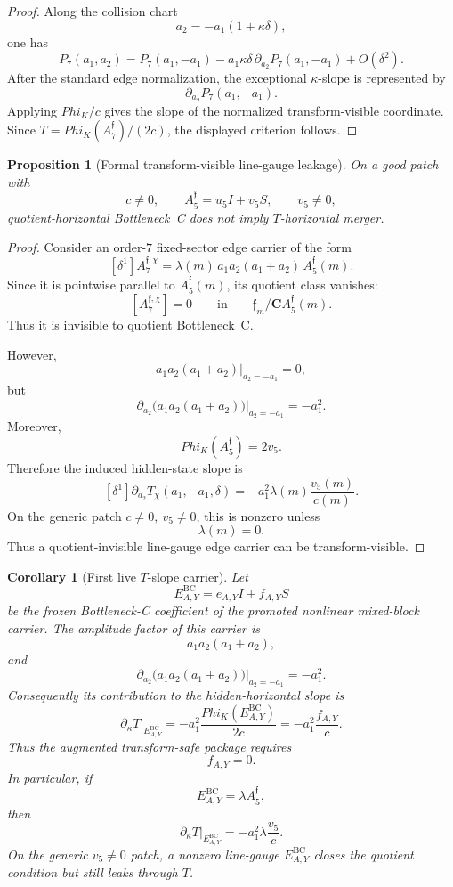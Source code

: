 \documentclass[11pt,a4paper]{amsart}
\def\Phi{Phi}%
\theoremstyle{plain}
\newtheorem{proposition}[theorem]{Proposition}
\newtheorem{corollary}[theorem]{Corollary}
\theoremstyle{definition}
\begin{document}
\begin{proof}
Along the collision chart
\[
a_2=-a_1(1+\kappa\delta),
\]
one has
\[
P_7(a_1,a_2)
=
P_7(a_1,-a_1)
-
a_1\kappa\delta\,\partial_{a_2}P_7(a_1,-a_1)
+
O(\delta^2).
\]
After the standard edge normalization, the exceptional \(\kappa\)-slope is
represented by
\[
\partial_{a_2}P_7(a_1,-a_1).
\]
Applying \(\Phi_K/c\) gives the slope of the normalized transform-visible
coordinate.  Since \(T=\Phi_K(A_7^{\mathfrak f})/(2c)\), the displayed
criterion follows.
\end{proof}

\begin{proposition}[Formal transform-visible line-gauge leakage]
\label{prop:formal-transform-visible-line-gauge-leakage}
On a good patch with
\[
c\ne0,
\qquad
A_5^{\mathfrak f}=u_5I+v_5S,
\qquad
v_5\ne0,
\]
quotient-horizontal Bottleneck~C does not imply \(T\)-horizontal merger.
\end{proposition}

\begin{proof}
Consider an order-\(7\) fixed-sector edge carrier of the form
\[
[\delta^1]A_7^{\mathfrak f,\chi}
=
\lambda(m)\,a_1a_2(a_1+a_2)\,A_5^{\mathfrak f}(m).
\]
Since it is pointwise parallel to \(A_5^{\mathfrak f}(m)\), its quotient class
vanishes:
\[
[A_7^{\mathfrak f,\chi}]=0
\qquad
\text{in}
\qquad
\mathfrak f_m/\mathbf C A_5^{\mathfrak f}(m).
\]
Thus it is invisible to quotient Bottleneck~C.

However,
\[
a_1a_2(a_1+a_2)\big|_{a_2=-a_1}=0,
\]
but
\[
\partial_{a_2}\bigl(a_1a_2(a_1+a_2)\bigr)\big|_{a_2=-a_1}
=
-a_1^2.
\]
Moreover,
\[
\Phi_K(A_5^{\mathfrak f})=2v_5.
\]
Therefore the induced hidden-state slope is
\[
[\delta^1]\partial_{a_2}T_\chi(a_1,-a_1,\delta)
=
-a_1^2\lambda(m)\frac{v_5(m)}{c(m)}.
\]
On the generic patch \(c\ne0,\ v_5\ne0\), this is nonzero unless
\[
\lambda(m)=0.
\]
Thus a quotient-invisible line-gauge edge carrier can be transform-visible.
\end{proof}

\begin{corollary}[First live \(T\)-slope carrier]
\label{cor:first-live-t-slope-carrier}
Let
\[
E_{A,Y}^{\mathrm{BC}}
=
e_{A,Y}I+f_{A,Y}S
\]
be the frozen Bottleneck-C coefficient of the promoted nonlinear mixed-block
carrier.  The amplitude factor of this carrier is
\[
a_1a_2(a_1+a_2),
\]
and
\[
\partial_{a_2}\bigl(a_1a_2(a_1+a_2)\bigr)\big|_{a_2=-a_1}
=
-a_1^2.
\]
Consequently its contribution to the hidden-horizontal slope is
\[
\partial_\kappa T\big|_{E_{A,Y}^{\mathrm{BC}}}
=
-a_1^2\frac{\Phi_K(E_{A,Y}^{\mathrm{BC}})}{2c}
=
-a_1^2\frac{f_{A,Y}}{c}.
\]
Thus the augmented transform-safe package requires
\[
f_{A,Y}=0.
\]
In particular, if
\[
E_{A,Y}^{\mathrm{BC}}=\lambda A_5^{\mathfrak f},
\]
then
\[
\partial_\kappa T\big|_{E_{A,Y}^{\mathrm{BC}}}
=
-a_1^2\lambda\frac{v_5}{c}.
\]
On the generic \(v_5\ne0\) patch, a nonzero line-gauge
\(E_{A,Y}^{\mathrm{BC}}\) closes the quotient condition but still leaks
through \(T\).
\end{corollary}
\end{document}
